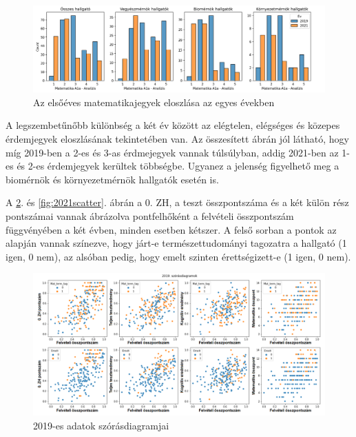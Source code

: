 \documentclass[12pt]{article}
\begin{document}
\begin{figure}[H] 
\centering
\includegraphics[width=\textwidth]{kepek/jegyek_eloszlas2.png}
\caption{Az elsőéves matematikajegyek eloszlása az egyes években}
\label{fig:jegyeloszlas}
\end{figure} 

\noindent A legszembetűnőbb különbség a két év között az elégtelen, elégséges és közepes érdemjegyek eloszlásának tekintetében van. Az összesített ábrán jól látható, hogy míg 2019-ben a 2-es és 3-as érdmejegyek vannak túlsúlyban, addig 2021-ben az 1-es és 2-es érdemjegyek kerültek többségbe. Ugyanez a jelenség figyelhető meg a biomérnök és környezetmérnök hallgatók esetén is.

A \ref{fig:2019scatter}. és \ref{fig:2021scatter}. ábrán a 0. ZH, a teszt összpontszáma és a két külön rész pontszámai vannak ábrázolva pontfelhőként a felvételi összpontszám függvényében a két évben, minden esetben kétszer. A felső sorban a pontok az alapján vannak színezve, hogy járt-e természettudományi tagozatra a hallgató (1 igen, 0 nem), az alsóban pedig, hogy emelt szinten érettségizett-e (1 igen, 0 nem).

\begin{figure}[H]
\centering
\includegraphics[width=\textwidth]{kepek/2019scatter.png}
\caption{2019-es adatok szórásdiagramjai}
\label{fig:2019scatter}
\end{figure}
\end{document}
